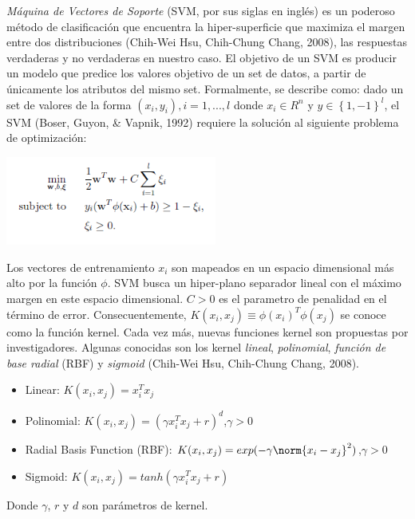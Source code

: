 \textit{Máquina de Vectores de Soporte} (SVM, por sus siglas en inglés) es un poderoso método de clasificación que encuentra la hiper-superficie que maximiza el margen entre dos distribuciones (Chih-Wei Hsu, Chih-Chung Chang, 2008), las respuestas verdaderas y no verdaderas en nuestro caso. El objetivo de un SVM es producir un modelo que predice los valores objetivo de un set de datos, a partir de únicamente los atributos del mismo set.  Formalmente, se describe como: dado un set de valores de la forma $(x_i,y_i), i=1, ..., l$  donde  $x_i \in R^n$ y $y\in\left\lbrace1,-1\right\rbrace^l$, el SVM (Boser, Guyon, \& Vapnik, 1992) requiere la solución al siguiente problema de optimización: 
\begin{center}
\includegraphics[height=1.15in]{figuras/Imagen1.png}
\end{center}
Los vectores de entrenamiento $x_i$ son mapeados en un espacio dimensional más alto por la función $\phi$. SVM busca un hiper-plano separador lineal con el máximo margen en este espacio dimensional. $C > 0$ es el parametro de penalidad en el término de error. Consecuentemente, $K(x_i,x_j)\equiv \phi(x_i )^T \phi(x_j)$ se conoce como la función kernel. Cada vez más, nuevas funciones kernel son propuestas por investigadores. Algunas conocidas son los kernel \textit{lineal}, \textit{polinomial}, \textit{función de base radial} (RBF) y \textit{sigmoid} (Chih-Wei Hsu, Chih-Chung Chang, 2008). 

\begin{itemize}
\item Linear: $K(x_i,x_j ) = x_i^Tx_j$
\item Polinomial: $K(x_i,x_j ) = (\gamma x_i^Tx_j + r)^d$,$\gamma > 0$
\item Radial Basis Function (RBF): $K(x_i,x_j ) = exp(-\gamma \norm{x_i-x_j}^2)$,$\gamma>0$
\item Sigmoid: $K(x_i,x_j ) = tanh(\gamma x_i^Tx_j + r)$
\end{itemize}

Donde $\gamma$, $r$ y $d$ son parámetros de kernel.  

